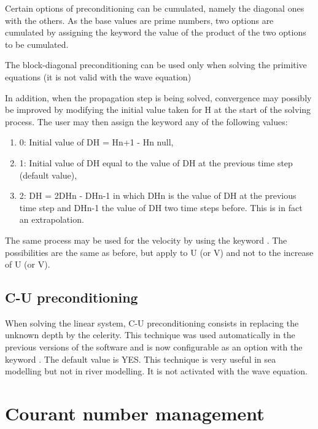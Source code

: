  Certain options of preconditioning can be cumulated, namely the diagonal ones with the others. As the base values are prime numbers, two options are cumulated by assigning the keyword the value of the product of the two options to be cumulated.

 The block-diagonal preconditioning can be used only when solving the primitive equations (it is not valid with the wave equation)

 In addition, when the propagation step is being solved, convergence may possibly be improved by modifying the initial value taken for H at the start of the solving process. The user may then assign the keyword  any of the following values:

\begin{enumerate}
\item [\nonumber] 0: Initial value of DH = Hn+1 - Hn  null,

\item [\nonumber] 1: Initial value of DH equal to the value of DH at the previous time step (default value),

\item [\nonumber]  2: DH = 2DHn - DHn-1 in which DHn is the value of DH at the previous time step and DHn-1 the value of DH two time steps before. This is in fact an extrapolation.
\end{enumerate}

 The same process may be used for the velocity by using the keyword . The possibilities are the same as before, but apply to U (or V) and not to the increase of U (or V).


\subsection{ C-U preconditioning}

 When solving the linear system, C-U preconditioning consists in replacing the unknown depth by the celerity. This technique was used automatically in the previous versions of the software and is now configurable as an option with the keyword . The default value is YES. This technique is very useful in sea modelling but not in river modelling. It is not activated with the wave equation.


\section{ Courant number management}

